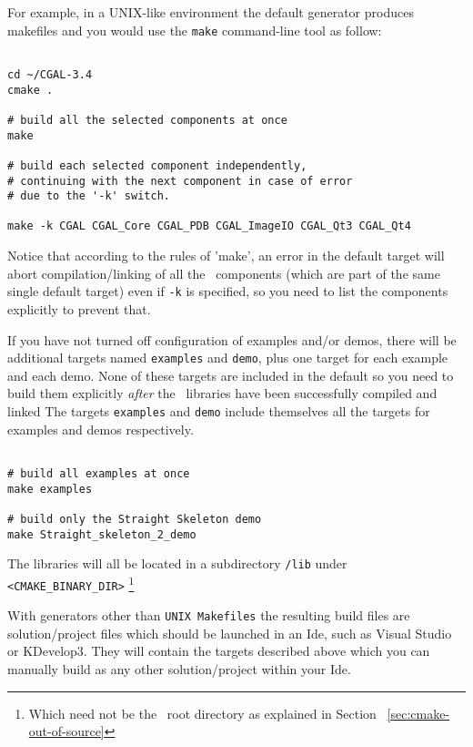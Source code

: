 For example, in a UNIX-like environment the default generator produces makefiles and you would
use the \texttt{make} command-line tool as follow:

{\ccTexHtml{\scriptsize}{}
\begin{verbatim}

cd ~/CGAL-3.4
cmake .

# build all the selected components at once
make 

# build each selected component independently,
# continuing with the next component in case of error
# due to the '-k' switch.

make -k CGAL CGAL_Core CGAL_PDB CGAL_ImageIO CGAL_Qt3 CGAL_Qt4

\end{verbatim}
}

Notice that according to the rules of 'make', an error in the default target will abort compilation/linking of
all the \cgal\ components (which are part of the same single default target) even if {\tt -k} 
is specified, so you need to list the components explicitly to prevent that.

If you have not turned off configuration of examples and/or demos, there will be additional
targets named \texttt{examples} and \texttt{demo}, plus one target for each example and each demo.
None of these targets are included in the default so you need to build them explicitly
{\em after} the \cgal\ libraries have been successfully compiled and linked
The targets \texttt{examples} and \texttt{demo} include themselves all the targets
for examples and demos respectively.

{\ccTexHtml{\scriptsize}{}
\begin{verbatim}

# build all examples at once
make examples 

# build only the Straight Skeleton demo
make Straight_skeleton_2_demo

\end{verbatim}
}

The libraries will all be located in a subdirectory {\tt /lib} under {\tt <CMAKE\_BINARY\_DIR>}
\footnote{Which need not be the \cgal\ root directory as explained in Section ~\ref{sec:cmake-out-of-source}}

With generators other than {\tt UNIX Makefiles} the resulting build files are solution/project files which
should be launched in an {\sc Ide}, such as Visual Studio or KDevelop3. They will contain the targets described
above which you can manually build as any other solution/project within your {\sc Ide}.

